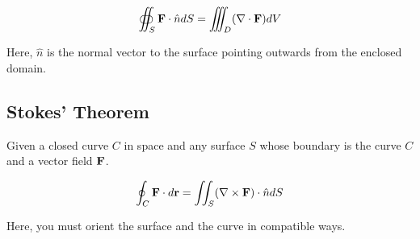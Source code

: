 $$ \oiint_S {\bf F} \cdot \hat{n} dS = \iiint_D (\nabla \cdot {\bf F}) dV $$

Here, $\hat{n}$ is the normal vector to the surface pointing outwards from the enclosed domain.

\subsection{Stokes' Theorem}

Given a closed curve $C$ in space and any surface $S$ whose boundary is the curve $C$
and a vector field ${\bf F}$.

$$ \oint_C {\bf F} \cdot d{\bf r} = \iint_S (\nabla \times {\bf F}) \cdot \hat{n} dS $$

Here, you must orient the surface and the curve in compatible ways.
